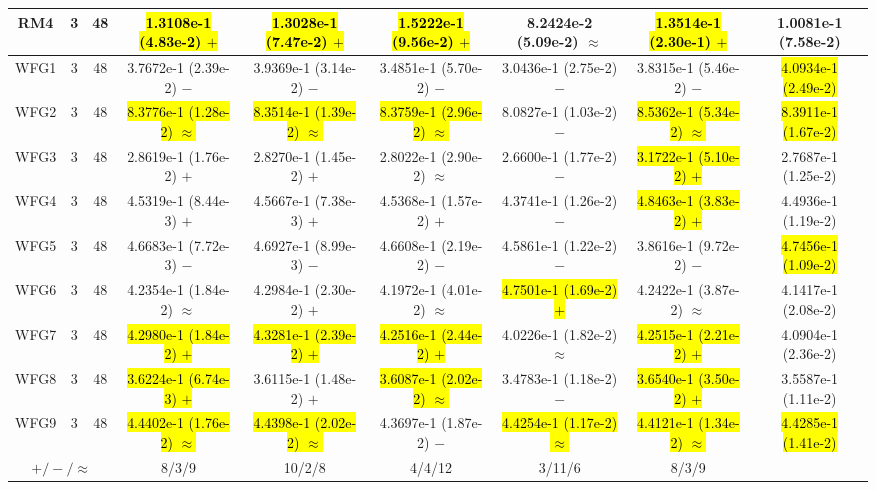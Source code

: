 \documentclass[journal]{IEEEtran}
\begin{document}
\begin{table*}[htbp]
\begin{tabular}{ccccccccc}
\hline
\multirow{1}{*}{RM4}&3&48&\hl{1.3108e-1 (4.83e-2) $+$}&\hl{1.3028e-1 (7.47e-2) $+$}&\hl{1.5222e-1 (9.56e-2) $+$}&8.2424e-2 (5.09e-2) $\approx$&\hl{1.3514e-1 (2.30e-1) $+$}&1.0081e-1 (7.58e-2)\\
\hline
\multirow{1}{*}{WFG1}&3&48&3.7672e-1 (2.39e-2) $-$&3.9369e-1 (3.14e-2) $-$&3.4851e-1 (5.70e-2) $-$&3.0436e-1 (2.75e-2) $-$&3.8315e-1 (5.46e-2) $-$&\hl{4.0934e-1 (2.49e-2)}\\
\hline
\multirow{1}{*}{WFG2}&3&48&\hl{8.3776e-1 (1.28e-2) $\approx$}&\hl{8.3514e-1 (1.39e-2) $\approx$}&\hl{8.3759e-1 (2.96e-2) $\approx$}&8.0827e-1 (1.03e-2) $-$&\hl{8.5362e-1 (5.34e-2) $\approx$}&\hl{8.3911e-1 (1.67e-2)}\\
\hline
\multirow{1}{*}{WFG3}&3&48&2.8619e-1 (1.76e-2) $+$&2.8270e-1 (1.45e-2) $+$&2.8022e-1 (2.90e-2) $\approx$&2.6600e-1 (1.77e-2) $-$&\hl{3.1722e-1 (5.10e-2) $+$}&2.7687e-1 (1.25e-2)\\
\hline
\multirow{1}{*}{WFG4}&3&48&4.5319e-1 (8.44e-3) $+$&4.5667e-1 (7.38e-3) $+$&4.5368e-1 (1.57e-2) $+$&4.3741e-1 (1.26e-2) $-$&\hl{4.8463e-1 (3.83e-2) $+$}&4.4936e-1 (1.19e-2)\\
\hline
\multirow{1}{*}{WFG5}&3&48&4.6683e-1 (7.72e-3) $-$&4.6927e-1 (8.99e-3) $-$&4.6608e-1 (2.19e-2) $-$&4.5861e-1 (1.22e-2) $-$&3.8616e-1 (9.72e-2) $-$&\hl{4.7456e-1 (1.09e-2)}\\
\hline
\multirow{1}{*}{WFG6}&3&48&4.2354e-1 (1.84e-2) $\approx$&4.2984e-1 (2.30e-2) $+$&4.1972e-1 (4.01e-2) $\approx$&\hl{4.7501e-1 (1.69e-2) $+$}&4.2422e-1 (3.87e-2) $\approx$&4.1417e-1 (2.08e-2)\\
\hline
\multirow{1}{*}{WFG7}&3&48&\hl{4.2980e-1 (1.84e-2) $+$}&\hl{4.3281e-1 (2.39e-2) $+$}&\hl{4.2516e-1 (2.44e-2) $+$}&4.0226e-1 (1.82e-2) $\approx$&\hl{4.2515e-1 (2.21e-2) $+$}&4.0904e-1 (2.36e-2)\\
\hline
\multirow{1}{*}{WFG8}&3&48&\hl{3.6224e-1 (6.74e-3) $+$}&3.6115e-1 (1.48e-2) $+$&\hl{3.6087e-1 (2.02e-2) $\approx$}&3.4783e-1 (1.18e-2) $-$&\hl{3.6540e-1 (3.50e-2) $+$}&3.5587e-1 (1.11e-2)\\
\hline
\multirow{1}{*}{WFG9}&3&48&\hl{4.4402e-1 (1.76e-2) $\approx$}&\hl{4.4398e-1 (2.02e-2) $\approx$}&4.3697e-1 (1.87e-2) $-$&\hl{4.4254e-1 (1.17e-2) $\approx$}&\hl{4.4121e-1 (1.34e-2) $\approx$}&\hl{4.4285e-1 (1.41e-2)}\\
\hline
\multicolumn{3}{c}{$+/-/\approx$}&8/3/9&10/2/8&4/4/12&3/11/6&8/3/9&\\
\bottomrule
\end{tabular}
\label{No Label}
\end{table*}
\end{document}
